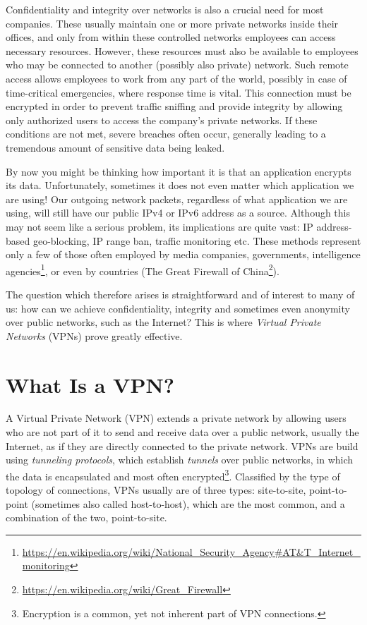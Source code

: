 \documentclass[a4paper,12pt]{report}
\begin{document}
		Confidentiality and integrity over networks is also a crucial need for most companies. These usually maintain one or more private networks inside their offices, and only from within these controlled networks employees can access necessary resources. However, these resources must also be available to employees who may be connected to another (possibly also private) network. Such remote access allows employees to work from any part of the world, possibly in case of time-critical emergencies, where response time is vital. This connection must be encrypted in order to prevent traffic sniffing and provide integrity by allowing only authorized users to access the company's private networks. If these conditions are not met, severe breaches often occur, generally leading to a tremendous amount of sensitive data being leaked.
		
	By now you might be thinking how important it is that an application encrypts its data. Unfortunately, sometimes it does not even matter which application we are using! Our outgoing network packets, regardless of what application we are using, will still have our public IPv4 or IPv6 address as a source. Although this may not seem like a serious problem, its implications are quite vast: IP address-based geo-blocking, IP range ban, traffic monitoring etc. These methods represent only a few of those often employed by media companies, governments, intelligence agencies\footnote{\url{https://en.wikipedia.org/wiki/National_Security_Agency\#AT&T_Internet_monitoring}}, or even by countries (The Great Firewall of China\footnote{\url{https://en.wikipedia.org/wiki/Great_Firewall}}).
		
	The question which therefore arises is straightforward and of interest to many of us: how can we achieve confidentiality, integrity and sometimes even anonymity over public networks, such as the Internet? This is where \textit{Virtual Private Networks} (VPNs) prove greatly effective.
		
		\section{What Is a VPN?}
		A Virtual Private Network (VPN) extends a private network by allowing users who are not part of it to send and receive data over a public network, usually the Internet, as if they are directly connected to the private network. VPNs are build using \textit{tunneling protocols}, which establish \textit{tunnels} over public networks, in which the data is encapsulated and most often encrypted\footnote{Encryption is a common, yet not inherent part of VPN connections.}. Classified by the type of topology of connections, VPNs usually are of three types: site-to-site, point-to-point (sometimes also called host-to-host), which are the most common, and a combination of the two, point-to-site.
		
\end{document}
